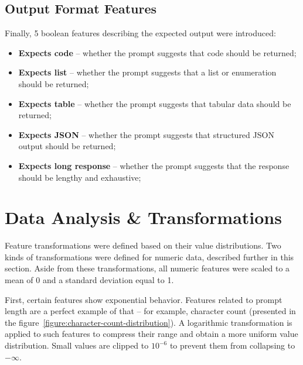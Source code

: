 \documentclass[a4paper,11pt,twoside]{report}
\theoremstyle{definition}
\begin{document}
\subsection{Output Format Features}

Finally, 5 boolean features describing the expected output were introduced:

\begin{itemize}
    \item \textbf{Expects code} -- whether the prompt suggests that code should be returned;
    \item \textbf{Expects list} -- whether the prompt suggests that a list or enumeration should be returned;
    \item \textbf{Expects table} -- whether the prompt suggests that tabular data should be returned;
    \item \textbf{Expects JSON} -- whether the prompt suggests that structured JSON output should be returned;
    \item \textbf{Expects long response} -- whether the prompt suggests that the response should be lengthy and exhaustive;
\end{itemize}

\section{Data Analysis \& Transformations}
\label{section:data-analysis-and-transformations}

Feature transformations were defined based on their value distributions. Two kinds of transformations were defined for numeric data, described further in this section. Aside from these transformations, all numeric features were scaled to a mean of 0 and a standard deviation equal to 1.

First, certain features show exponential behavior. Features related to prompt length are a perfect example of that -- for example, character count (presented in the figure~\ref{figure:character-count-distribution}). A logarithmic transformation is applied to such features to compress their range and obtain a more uniform value distribution. Small values are clipped to $10^{-6}$ to prevent them from collapsing to $-\infty$. 
\end{document}
